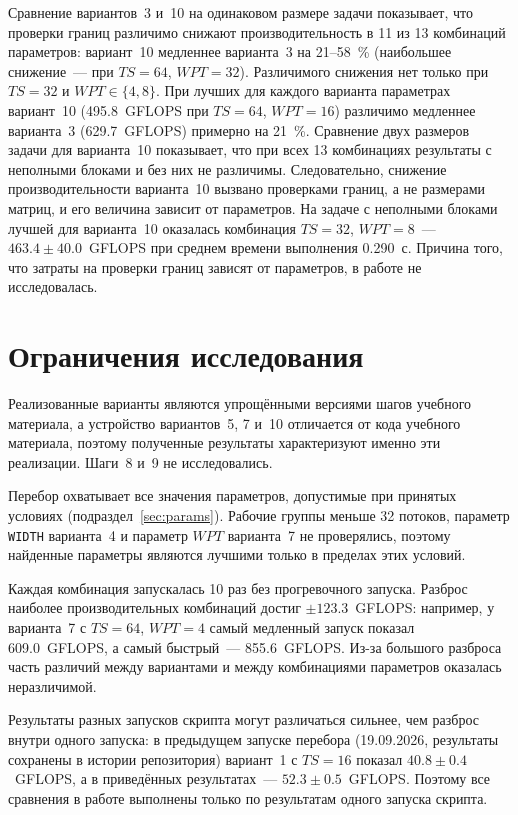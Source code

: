 \documentclass[a4paper]{article}
\begin{document}
Сравнение вариантов~3 и~10 на одинаковом размере задачи показывает, что
проверки границ различимо снижают производительность в 11 из 13
комбинаций параметров: вариант~10 медленнее варианта~3 на 21--58~\%
(наибольшее снижение~--- при $TS=64$, $WPT=32$). Различимого снижения
нет только при $TS=32$ и $WPT \in \{4, 8\}$. При лучших для каждого
варианта параметрах вариант~10 (495.8~GFLOPS при $TS=64$, $WPT=16$)
различимо медленнее варианта~3 (629.7~GFLOPS) примерно на 21~\%.
Сравнение двух размеров задачи для варианта~10 показывает, что при
всех 13 комбинациях результаты с неполными блоками и без них не
различимы. Следовательно, снижение производительности варианта~10
вызвано проверками границ, а не размерами матриц, и его величина
зависит от параметров. На задаче с неполными блоками лучшей для
варианта~10 оказалась комбинация $TS=32$, $WPT=8$~---
$463.4 \pm 40.0$~GFLOPS при среднем времени выполнения 0.290~с.
Причина того, что затраты на проверки границ зависят от параметров, в
работе не исследовалась.

\section{Ограничения исследования}

Реализованные варианты являются упрощёнными версиями шагов учебного
материала, а устройство вариантов~5, 7 и~10 отличается от кода
учебного материала, поэтому полученные результаты характеризуют именно
эти реализации. Шаги~8 и~9 не исследовались.

Перебор охватывает все значения параметров, допустимые при принятых
условиях (подраздел~\ref{sec:params}). Рабочие группы меньше
32 потоков, параметр \texttt{WIDTH} варианта~4 и параметр $WPT$
варианта~7 не проверялись, поэтому найденные параметры являются
лучшими только в пределах этих условий.

Каждая комбинация запускалась 10 раз без прогревочного запуска.
Разброс наиболее производительных комбинаций достиг
$\pm 123.3$~GFLOPS: например, у варианта~7 с $TS=64$, $WPT=4$ самый
медленный запуск показал 609.0~GFLOPS, а самый быстрый~--- 855.6~GFLOPS.
Из-за большого разброса часть различий между вариантами и между
комбинациями параметров оказалась неразличимой.

Результаты разных запусков скрипта могут различаться сильнее, чем
разброс внутри одного запуска: в предыдущем запуске перебора
(19.09.2026, результаты сохранены в истории репозитория) вариант~1 с
$TS=16$ показал $40.8 \pm 0.4$~GFLOPS, а в приведённых результатах~---
$52.3 \pm 0.5$~GFLOPS. Поэтому все сравнения в работе выполнены только
по результатам одного запуска скрипта.
\end{document}
